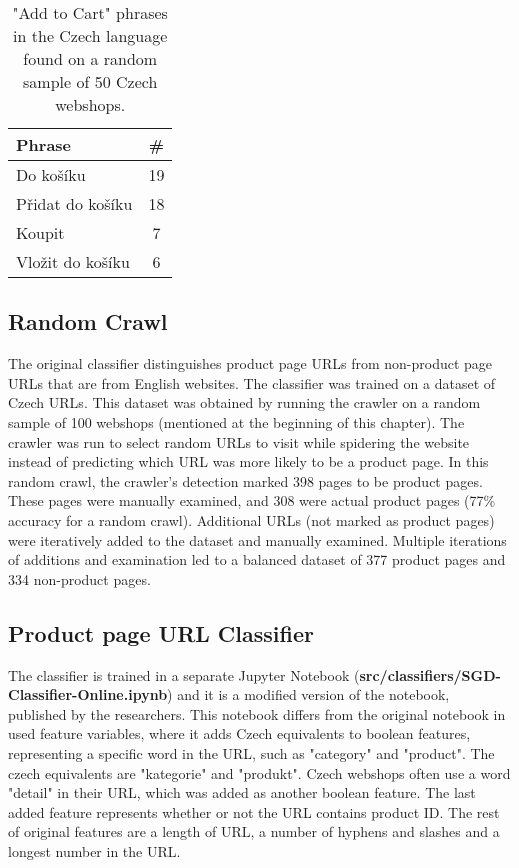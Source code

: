     \begin{table}[h!]
        \centering
        \begin{tabular}{l | c} 
        \textbf{Phrase} & \textbf{\#} \\ [0.5ex] 
        \hline
        Do košíku & 19 \\ \hline
        Přidat do košíku & 18 \\ \hline
        Koupit & 7 \\ \hline
        Vložit do košíku & 6 \\ [1ex] 
        \end{tabular}
        \caption{"Add to Cart" phrases in the Czech language found on a random sample of 50 Czech webshops.}
        \label{table:add-to-cart-phrases}
    \end{table}

    \subsection{Random Crawl}

    The original classifier distinguishes product page URLs from non-product page URLs that are from English websites. The classifier was trained on a dataset of Czech URLs. This dataset was obtained by running the crawler on a random sample of 100 webshops (mentioned at the beginning of this chapter). The crawler was run to select random URLs to visit while spidering the website instead of predicting which URL was more likely to be a product page. In this random crawl, the crawler's detection marked 398 pages to be product pages. These pages were manually examined, and 308 were actual product pages (77\% accuracy for a random crawl). Additional URLs (not marked as product pages) were iteratively added to the dataset and manually examined. Multiple iterations of additions and examination led to a balanced dataset of 377 product pages and 334 non-product pages.

    \subsection{Product page URL Classifier}

    The classifier is trained in a separate Jupyter Notebook (\textbf{src/classifiers/SGD-Classifier-Online.ipynb}) and it is a modified version of the notebook, published by the researchers. This notebook differs from the original notebook in used feature variables, where it adds Czech equivalents to boolean features, representing a specific word in the URL, such as "category" and "product". The czech equivalents are "kategorie" and "produkt". Czech webshops often use a word "detail" in their URL, which was added as another boolean feature. The last added feature represents whether or not the URL contains product ID. The rest of original features are a length of URL, a number of hyphens and slashes and a longest number in the URL. 

